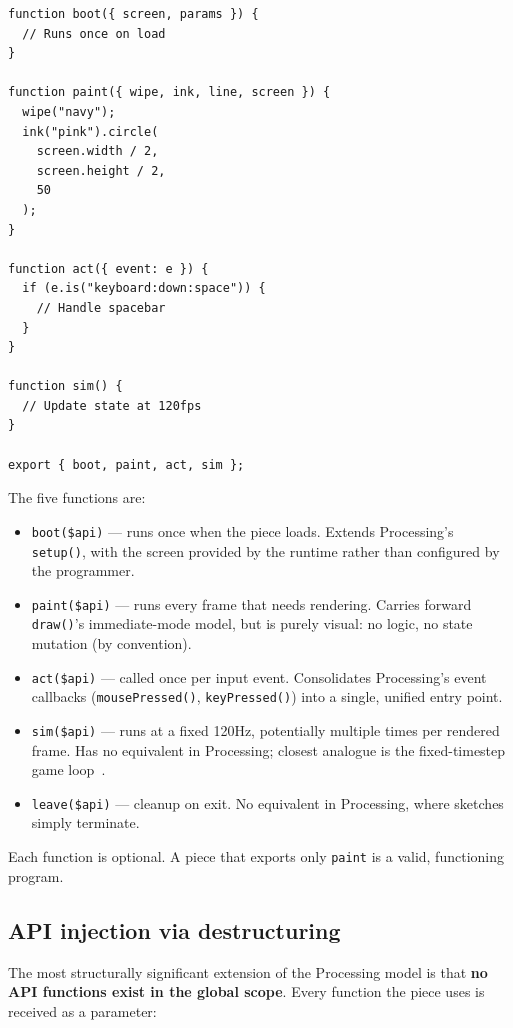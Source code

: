 \documentclass[10pt,letterpaper,twocolumn]{article}
\begin{document}
\begin{lstlisting}[style=acjsstyle,caption={Minimal AC piece.}]
function boot({ screen, params }) {
  // Runs once on load
}

function paint({ wipe, ink, line, screen }) {
  wipe("navy");
  ink("pink").circle(
    screen.width / 2,
    screen.height / 2,
    50
  );
}

function act({ event: e }) {
  if (e.is("keyboard:down:space")) {
    // Handle spacebar
  }
}

function sim() {
  // Update state at 120fps
}

export { boot, paint, act, sim };
\end{lstlisting}

The five functions are:

\begin{itemize}
  \item \texttt{boot(\$api)} --- runs once when the piece loads. Extends Processing's \texttt{setup()}, with the screen provided by the runtime rather than configured by the programmer.
  \item \texttt{paint(\$api)} --- runs every frame that needs rendering. Carries forward \texttt{draw()}'s immediate-mode model, but is purely visual: no logic, no state mutation (by convention).
  \item \texttt{act(\$api)} --- called once per input event. Consolidates Processing's event callbacks (\texttt{mousePressed()}, \texttt{keyPressed()}) into a single, unified entry point.
  \item \texttt{sim(\$api)} --- runs at a fixed 120Hz, potentially multiple times per rendered frame. Has no equivalent in Processing; closest analogue is the fixed-timestep game loop~\citep{nystrom2014game}.
  \item \texttt{leave(\$api)} --- cleanup on exit. No equivalent in Processing, where sketches simply terminate.
\end{itemize}

Each function is optional. A piece that exports only \texttt{paint} is a valid, functioning program.

\subsection{API injection via destructuring}

The most structurally significant extension of the Processing model is that \textbf{no API functions exist in the global scope}. Every function the piece uses is received as a parameter:
\end{document}
